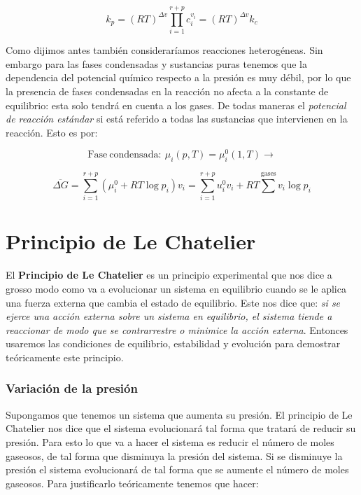 \documentclass[12pt]{book}
\begin{document}
\begin{equation}
k_p = (RT)^{\Delta v} \prod_{i=1}^{r+p} c_i^{v_i} = (RT)^{\Delta v} k_c
\end{equation}


Como dijimos antes también consideraríamos reacciones heterogéneas. Sin embargo para las fases condensadas y sustancias puras tenemos que la dependencia del potencial químico respecto a la presión es muy débil, por lo que la presencia de fases condensadas en la reacción no afecta a la constante de equilibrio: esta solo tendrá en cuenta a los gases. De todas maneras el \textit{potencial de reacción estándar} si está referido a todas las sustancias que intervienen en la reacción. Esto es por:

$$ \mathrm{Fase \ condensada:} \ \mu_i (p,T) = \mu_i^0 (1,T) \longrightarrow $$

\begin{equation}
 \overline{\Delta G} = \sum_{i=1}^{r+p} (\mu_i^0 + RT \log p_i ) v_i = \sum_{i=1}^{r+p} u_i^0 v_i + RT \sum^{\mathrm{gases}} v_i \log p_i
\end{equation}

\section{Principio de Le Chatelier}

El \textbf{Principio de Le Chatelier} es un principio experimental que nos dice a grosso modo como va a evolucionar un sistema en equilibrio cuando se le aplica una fuerza externa que cambia el estado de equilibrio. Este nos dice que: \textit{si se ejerce una acción externa sobre un sistema en equilibrio, el sistema tiende a reaccionar de modo que se contrarrestre o minimice la acción externa}. Entonces usaremos las condiciones de equilibrio, estabilidad y evolución para demostrar teóricamente este principio.

\subsubsection*{Variación de la presión}

Supongamos que tenemos un sistema que aumenta su presión. El principio de Le Chatelier nos  dice que el sistema evolucionará tal forma que tratará de reducir su presión. Para esto lo que va a hacer el sistema es reducir el número de moles gaseosos, de tal forma que disminuya la presión del sistema. Si se disminuye la presión el sistema evolucionará de tal forma que se aumente el número de moles gaseosos. Para justificarlo teóricamente tenemos que hacer:
\end{document}
